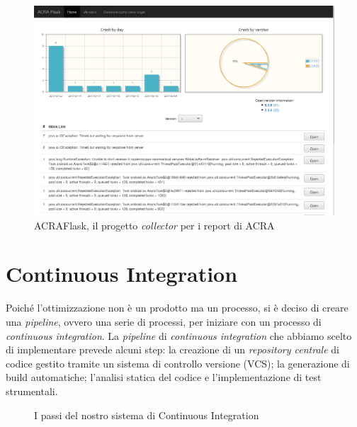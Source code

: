 \documentclass[a4paper,10pt]{memoir}
\begin{document}
\begin{figure}[ht]
\centering
\caption{ACRAFlask, il progetto \textit{collector} per i report di ACRA}
\label{fig:acraflask}
\includegraphics[width=\textwidth]{dev/acraflask}
\end{figure}

\clearpage

\section{Continuous Integration}

Poiché l'ottimizzazione non è un prodotto ma un processo, si è deciso di creare una \textit{pipeline}, ovvero una serie di processi, per iniziare con un processo di \textit{continuous integration}. La \textit{pipeline} di \textit{continuous integration} che abbiamo scelto di implementare prevede alcuni step: la creazione di un \textit{repository centrale} di codice gestito tramite un sistema di controllo versione (VCS); la generazione di build automatiche; l'analisi statica del codice e l'implementazione di test strumentali.

\begin{figure}[ht]
\centering
\caption{I passi del nostro sistema di Continuous Integration}
\end{figure}
\end{document}
